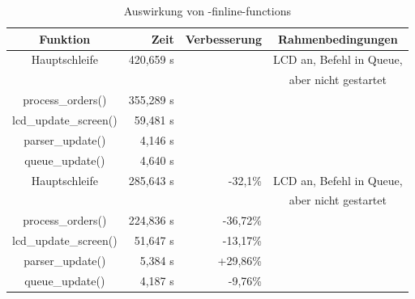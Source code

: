 \begin{table}[htb]
\begin{center}
	\begin{tabular}{|c||r|r|c|}
		\hline
		\textbf{Funktion} & \textbf{Zeit} & \textbf{Verbesserung} & \textbf{Rahmenbedingungen} \\ \hline \hline
		Hauptschleife & 420,659 \textmu{}s & & LCD an, Befehl in Queue,\\
		& & & aber nicht gestartet \\ \hline
		process\_orders() & 355,289 \textmu{}s &  & \\ \hline
		lcd\_update\_screen() & 59,481 \textmu{}s & & \\ \hline
		parser\_update() & 4,146 \textmu{}s &  & \\ \hline
		queue\_update() & 4,640 \textmu{}s &  & \\ \hline \hline
		Hauptschleife & 285,643 \textmu{}s & -32,1\% & LCD an, Befehl in Queue,\\
		& & & aber nicht gestartet \\ \hline
		process\_orders() & 224,836 \textmu{}s & -36,72\% & \\ \hline
		lcd\_update\_screen() & 51,647 \textmu{}s & -13,17\% & \\ \hline
		parser\_update() & 5,384 \textmu{}s & +29,86\% & \\ \hline
		queue\_update() & 4,187 \textmu{}s & -9,76\% & \\ \hline
	\end{tabular}
	\caption{\label{compiler_flags_2} Auswirkung von -finline-functions}
\end{center}
\end{table}
